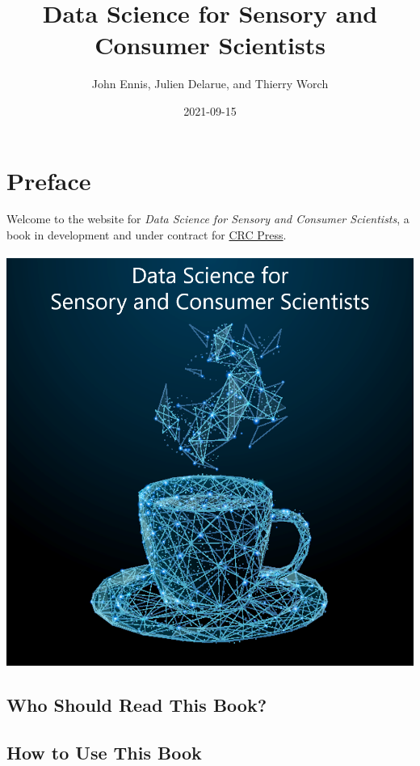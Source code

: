 \documentclass[
]{book}
\title{Data Science for Sensory and Consumer Scientists}
\author{John Ennis, Julien Delarue, and Thierry Worch}
\date{2021-09-15}
\begin{document}
\maketitle

{
\setcounter{tocdepth}{1}
\tableofcontents
}
\hypertarget{preface}{%
\chapter*{Preface}\label{preface}}

Welcome to the website for \emph{Data Science for Sensory and Consumer Scientists}, a book in development and under contract for \href{https://www.routledge.com/}{CRC Press}.

\begin{center}\includegraphics[width=13.44in]{images/cover_art} \end{center}

\hypertarget{who-should-read-this-book}{%
\section*{Who Should Read This Book?}\label{who-should-read-this-book}}

\hypertarget{how-to-use-this-book}{%
\section*{How to Use This Book}\label{how-to-use-this-book}}
\end{document}
